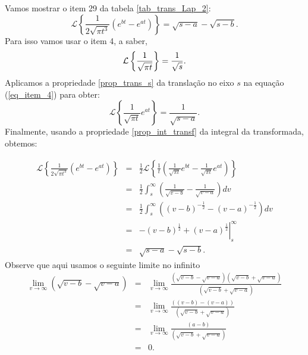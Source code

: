 \begin{ex}Vamos mostrar o item 29 da tabela \ref{tab_trans_Lap_2}:
$$
\mathcal{L}\left\{\frac{1}{2\sqrt{\pi t^3}}\left(e^{bt}-e^{at}\right)\right\}=\sqrt{s-a}-\sqrt{s-b}.
$$
Para isso vamos usar o item 4, a saber,
\begin{equation}{\label{eq_item_4}}
\mathcal{L}\left\{\frac{1}{\sqrt{\pi t}}\right\}=\frac{1}{\sqrt{s}}.
\end{equation}
Aplicamos a propriedade \ref{prop_trans_s} da translação no eixo $s$ na equação (\ref{eq_item_4}) para obter:
\begin{equation*}
\mathcal{L}\left\{\frac{1}{\sqrt{\pi t}}e^{at}\right\}=\frac{1}{\sqrt{s-a}}.
\end{equation*}
Finalmente, usando a propriedade \ref{prop_int_transf} da integral da transformada, obtemos:

\begin{eqnarray*}
\mathcal{L}\left\{\frac{1}{2\sqrt{\pi t^3}}\left(e^{bt}-e^{at}\right)\right\}&=&\frac{1}{2}\mathcal{L}\left\{\frac{1}{t}\left(\frac{1}{\sqrt{\pi t}}e^{bt}-\frac{1}{\sqrt{\pi t}}e^{at}\right)\right\}\\
&=&\frac{1}{2}\int_s^\infty\left(   \frac{1}{\sqrt{v-b}}-  \frac{1}{\sqrt{v-a}}\right)dv\\
&=&\frac{1}{2}\int_s^\infty  \left( \left(v-b\right)^{-\frac{1}{2}}-  \left(v-a\right)^{-\frac{1}{2}}\right)dv\\
&=&\left. -\left(v-b\right)^{\frac{1}{2}}+ \left(v-a\right)^{\frac{1}{2}}\right|_s^\infty\\
&=&\sqrt{s-a}-\sqrt{s-b}.
\end{eqnarray*}
Observe que aqui usamos o seguinte limite no infinito
\begin{eqnarray*}
\lim_{v\to\infty}\left( \sqrt{v-b}- \sqrt{v-a}\right)&=&\lim_{v\to\infty}\frac{\left(\sqrt{v-b}- \sqrt{v-a}\right)\left(\sqrt{v-b}+ \sqrt{v-a}\right)}{\left(\sqrt{v-b}+ \sqrt{v-a}\right)}\\
&=&\lim_{v\to\infty}\frac{\left((v-b)- (v-a)\right)}{\left(\sqrt{v-b}+ \sqrt{v-a}\right)}\\
&=&\lim_{v\to\infty}\frac{\left(a-b\right)}{\left(\sqrt{v-b}+ \sqrt{v-a}\right)}\\
&=&0.
\end{eqnarray*}
\end{ex}

